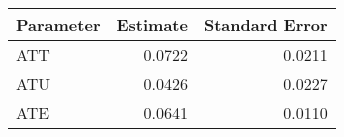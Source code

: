 \begin{tabular}{lrr}
\toprule
Parameter &  Estimate &  Standard Error \\
\midrule
      ATT &    0.0722 &          0.0211 \\
      ATU &    0.0426 &          0.0227 \\
      ATE &    0.0641 &          0.0110 \\
\bottomrule
\end{tabular}
